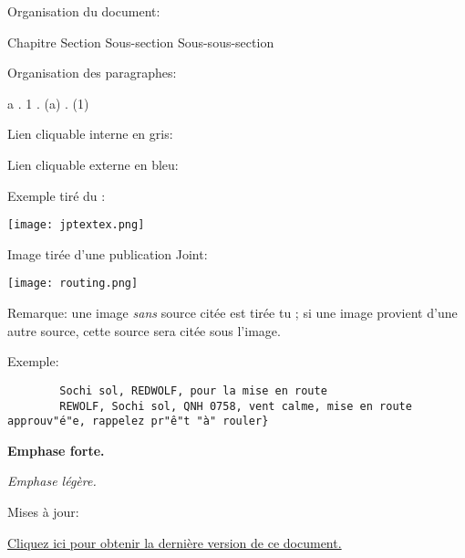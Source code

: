 
%

\begin{e1}
	\item Organisation du document:

	{\Large Chapitre} {\large Section} Sous-section {\small Sous-sous-section}

	\item Organisation des paragraphes:

	{\Large a} . {\large 1} . (a) . {\small (1)}
	
	\item Lien cliquable interne en \textcolor{\intlink}{gris}:
	
	
	\item Lien cliquable externe en \textcolor{\extlink}{bleu}:
	
	\thirdwing

	\item Exemple tiré du \jp{}:

	\texttt{[image: jptextex.png]}

	\item Image tirée d'une publication Joint:

	\texttt{[image: routing.png]}
	
	Remarque: une image \emph{sans} source citée est tirée tu \jp{}; si une image provient d'une autre source, cette source sera citée sous l'image.

	\item Exemple:
	\begin{lstlisting}
		Sochi sol, REDWOLF, pour la mise en route
		REWOLF, Sochi sol, QNH 0758, vent calme, mise en route approuv"é"e, rappelez pr"ê"t "à" rouler}
	\end{lstlisting}

	\item \textbf{Emphase forte.}

	\item \emph{Emphase légère.}

	\item {}
	
	
	\item {}

	\item {}
	
	\item Mises à jour:
	
	\href{\latest}{Cliquez ici pour obtenir la dernière version de ce document.}

\end{e1} 